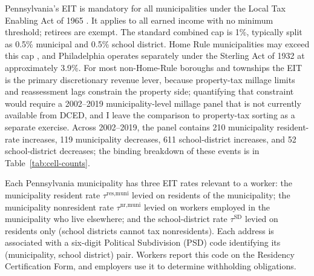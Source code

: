 \documentclass[12pt]{article}
\begin{document}
Pennsylvania's EIT is mandatory for all municipalities under the
Local Tax Enabling Act of 1965 \citep[Act 511;][]{paAct511_1965}.
It applies to all earned income with no minimum threshold; retirees
are exempt. The standard combined cap is 1\%, typically split as
0.5\% municipal and 0.5\% school district. Home Rule municipalities
may exceed this cap \citep{paHomeRule}, and Philadelphia operates
separately under the Sterling Act of 1932
\citep{paSterlingAct_1932} at approximately 3.9\%. For most non-Home-Rule
boroughs and townships the EIT is the primary discretionary revenue
lever, because property-tax millage limits and reassessment lags
constrain the property side; quantifying that constraint would
require a 2002--2019 municipality-level millage panel that is not currently
available from DCED, and I leave the comparison to property-tax
sorting as a separate exercise. Across 2002--2019, the panel contains
210 municipality resident-rate increases, 119 municipality decreases, 611
school-district increases, and 52 school-district decreases; the
binding breakdown of these events is in
Table~\ref{tab:cell-counts}.

Each Pennsylvania municipality has three EIT rates relevant to a
worker:
%
the municipality resident rate $\tau^{\text{res,muni}}$ levied on residents of the municipality; the municipality nonresident rate $\tau^{\text{nr,muni}}$ levied on workers employed in the municipality who live elsewhere; and the school-district rate $\tau^{\text{SD}}$ levied on residents only (school districts cannot tax nonresidents).
%
Each address is associated with a six-digit Political Subdivision (PSD)
code identifying its (municipality, school district) pair. Workers report this
code on the Residency Certification Form, and employers use it to
determine withholding obligations.
\end{document}

